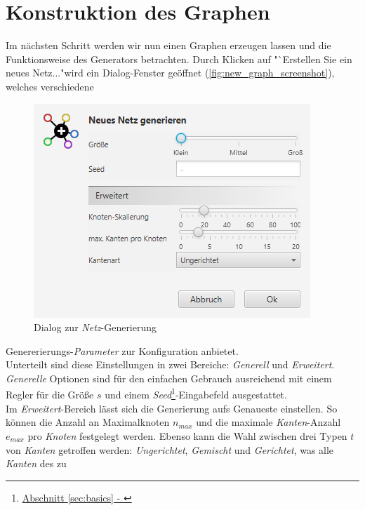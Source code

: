 \documentclass[12pt]{article}
\begin{document}
\section{Konstruktion des Graphen}
\label{sec:construct}
Im nächsten Schritt werden wir nun einen Graphen erzeugen lassen und die Funktionsweise des Generators betrachten. 
Durch Klicken auf "`Erstellen Sie ein neues Netz..."\;wird ein Dialog-Fenster geöffnet (\autoref{fig:new_graph_screenshot}), welches verschiedene 
\begin{figure}
\vspace{-20pt}
\begin{center}
\includegraphics[scale=0.6]{res/new_graph_screenshot.png}
\end{center}
\vspace{-20pt}
\centering
\caption{Dialog zur \textit{Netz}-Generierung}
\label{fig:new_graph_screenshot}
\end{figure}
Genererierungs-\textit{Parameter} zur Konfiguration anbietet. 
\\
Unterteilt sind diese Einstellungen in zwei Bereiche: \textit{Generell} und \textit{Erweitert}. \textit{Generelle} Optionen sind für den einfachen Gebrauch ausreichend mit einem Regler für die Größe $s$ und einem 
\textit{Seed}\footnote{\hyperref[sec:basics]{Abschnitt \ref*{sec:basics} - }}-Eingabefeld ausgestattet.
\\
Im \textit{Erweitert}-Bereich lässt sich die Generierung aufs Genaueste einstellen. So können die Anzahl an Maximalknoten $n_{max}$ und die maximale \textit{Kanten}-Anzahl $e_{max}$ pro \textit{Knoten} 
festgelegt werden. Ebenso kann die Wahl zwischen drei Typen $t$ von \textit{Kanten} getroffen werden: \textit{Ungerichtet}, \textit{Gemischt} und \textit{Gerichtet}\footnotemark[1], was alle \textit{Kanten} des zu 
\end{document}
